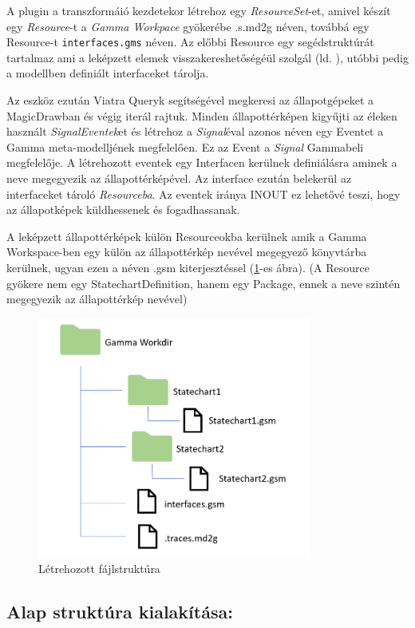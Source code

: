 A plugin a transzformáió kezdetekor létrehoz egy \emph{ResourceSet}-et, amivel készít egy \emph{Resource}-t a \emph{Gamma Workpace} gyökerébe .s.md2g néven, továbbá egy Resource-t \verb+interfaces.gms+ néven. Az előbbi Resource egy segédstruktúrát tartalmaz ami a leképzett elemek visszakereshetőségéül szolgál (ld. ), utóbbi pedig a modellben definiált interfaceket tárolja.

Az eszköz ezután Viatra Queryk segítségével megkeresi az állapotgépeket a MagicDrawban és végig iterál rajtuk. Minden állapottérképen kigyűjti az éleken használt \emph{SignalEventek}et és létrehoz a \emph{Signal}éval azonos néven egy Eventet a Gamma meta-modelljének megfelelően. Ez az Event a \emph{Signal} Gammabeli megfelelője.  A létrehozott eventek egy Interfacen kerülnek definiálásra aminek a neve megegyezik az állapottérképével. Az interface ezután belekerül az interfaceket tároló \emph{Resourceba}. Az eventek iránya INOUT ez lehetővé teszi, hogy az állapotképek küldhessenek és fogadhassanak.

A leképzett állapottérképek külön Resourceokba kerülnek amik a Gamma Workspace-ben egy külön az állapottérkép nevével megegyező könyvtárba kerülnek, ugyan ezen a néven .gsm kiterjesztéssel (\ref{fig:filestructure}-es ábra). (A Resource gyökere nem egy StatechartDefinition, hanem egy Package, ennek a neve szintén megegyezik az állapottérkép nevével)

\begin{figure}[H]
	\centering
	\includegraphics[keepaspectratio, width=90mm]{figures/filestructure.png}
	\caption{Létrehozott fájlstruktúra}
	\label{fig:filestructure}
\end{figure}

\subsection{Alap struktúra kialakítása:}


